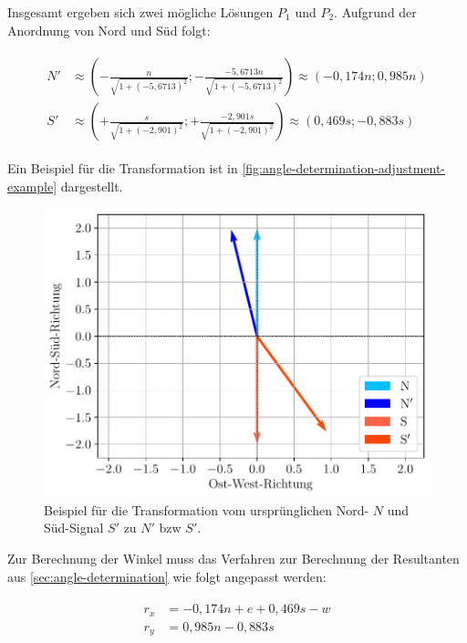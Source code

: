 Insgesamt ergeben sich zwei mögliche Lösungen $P_1$ und $P_2$. Aufgrund der Anordnung von Nord und Süd folgt:

\vspace{-0.75cm}
\begin{gather*}
    \begin{aligned}
        N' &\approx \left(-\frac{n}{\sqrt{1+(-5,6713)^2}}; -\frac{-5,6713n}{\sqrt{1+(-5,6713)^2}}\right) \approx \left(-0,174n; 0,985n\right) \\[0.2cm]
        S' &\approx \left(+ \frac{s}{\sqrt{1+(-2,901)^2}}; + \frac{-2,901s}{\sqrt{1+(-2,901)^2}}\right) \approx \left( 0,469s; -0,883s \right)
    \end{aligned}
\end{gather*}
\vspace{-0.5cm}

Ein Beispiel für die Transformation ist in \autoref{fig:angle-determination-adjustment-example} dargestellt.

\begin{figure}[h]
    \centering
    \includegraphics[width=\textwidth]{../plot/angle_adjustment/trigonometry.pdf}
    \caption{Beispiel für die Transformation vom ursprünglichen Nord- $N$ und Süd\hyphen Signal $S'$ zu $N'$ bzw $S'$.}
    \label{fig:angle-determination-adjustment-example}
\end{figure}

Zur Berechnung der Winkel muss das Verfahren zur Berechnung der Resultanten aus \autoref{sec:angle-determination} wie folgt angepasst werden:

\vspace{-0.75cm}
\begin{gather*}
    \begin{aligned}
        r_x &= -0,174n + e + 0,469s - w \\
        r_y &= 0,985n - 0,883s
    \end{aligned}
\end{gather*}
\vspace{-0.5cm}


